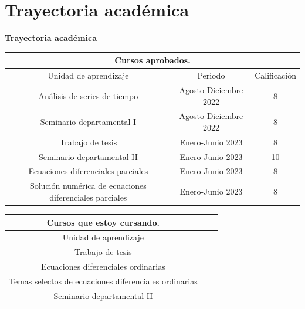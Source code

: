 \documentclass[10pt]{beamer}
\newtheorem{final remarks}{final remarks}[section]
\newtheorem{future work collaboration}{future work collaboration}[section]
\begin{document}
\begin{frame}
\titlepage
\end{frame}

\section{Trayectoria acad\'emica}
\begin{frame}
    \begin{center}
        \textbf{Trayectoria acad\'emica}
    \end{center}
    \begin{scriptsize}
    \begin{table}[t]
        \begin{center}
            \begin{tabular}{|c|c|c|}
                \hline
                \multicolumn{3}{|c|}{\textbf{Cursos aprobados.}} \\ \hline
                Unidad de aprendizaje & Periodo & Calificaci\'on \\ \hline
                An\'alisis de series de tiempo	 & Agosto-Diciembre 2022 & 8 \\
                Seminario departamental I & Agosto-Diciembre 2022 & 8 \\
                Trabajo de tesis & Enero-Junio 2023 & 8 \\
                Seminario departamental II & Enero-Junio 2023 & 10 \\ 
                Ecuaciones diferenciales parciales & Enero-Junio 2023 & 8 \\
                Soluci\'on num\'erica de ecuaciones diferenciales parciales & Enero-Junio 2023 & 8 \\
                \hline
            \end{tabular}
        \end{center}    
    \end{table}
    \end{scriptsize}
    \begin{scriptsize}
        \begin{table}[t]
            \begin{center}
                \begin{tabular}{|c|c|c|}
                    \hline
                    \textbf{Cursos que estoy cursando.} \\ \hline
                    Unidad de aprendizaje \\ \hline
                    Trabajo de tesis \\
                    Ecuaciones diferenciales ordinarias \\
                    Temas selectos de ecuaciones diferenciales ordinarias \\
                    Seminario departamental II \\
                    \hline
                \end{tabular}
            \end{center}    
        \end{table}
    \end{scriptsize}
\end{frame}
\end{document}
